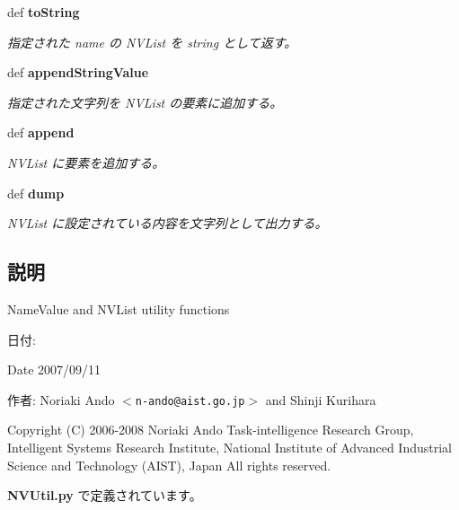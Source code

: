 \begin{CompactItemize}
def {\bf toString}
\begin{CompactList}\small\item\em 指定された name の NVList を string として返す。 \item\end{CompactList}\item 
def {\bf appendStringValue}
\begin{CompactList}\small\item\em 指定された文字列を NVList の要素に追加する。 \item\end{CompactList}\item 
def {\bf append}
\begin{CompactList}\small\item\em NVList に要素を追加する。 \item\end{CompactList}\item 
def {\bf dump}
\begin{CompactList}\small\item\em NVList に設定されている内容を文字列として出力する。 \item\end{CompactList}\end{CompactItemize}


\subsection{説明}
NameValue and NVList utility functions 

\begin{Desc}
\item[日付:]\end{Desc}
\begin{Desc}
\item[Date]2007/09/11\end{Desc}
\begin{Desc}
\item[作者:]Noriaki Ando $<${\tt n-ando@aist.go.jp}$>$ and Shinji Kurihara\end{Desc}
Copyright (C) 2006-2008 Noriaki Ando Task-intelligence Research Group, Intelligent Systems Research Institute, National Institute of Advanced Industrial Science and Technology (AIST), Japan All rights reserved. 

 {\bf NVUtil.py} で定義されています。